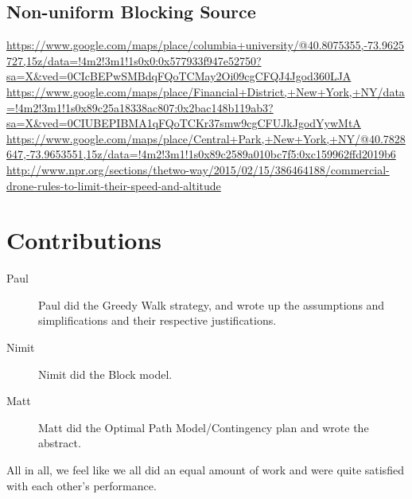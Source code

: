 \documentclass{article}
\begin{document}
\subsection{Non-uniform Blocking Source}
\label{sub:fk}






\begin{thebibliography}{9}
    \url{https://www.google.com/maps/place/columbia+university/@40.8075355,-73.9625727,15z/data=!4m2!3m1!1s0x0:0x577933f947e52750?sa=X&ved=0CIcBEPwSMBdqFQoTCMay2Oi09cgCFQJ4Jgod360LJA}
    \url{https://www.google.com/maps/place/Financial+District,+New+York,+NY/data=!4m2!3m1!1s0x89c25a18338ac807:0x2bac148b119ab3?sa=X&ved=0CIUBEPIBMA1qFQoTCKr37smw9cgCFUJkJgodYywMtA}
    \url{https://www.google.com/maps/place/Central+Park,+New+York,+NY/@40.7828647,-73.9653551,15z/data=!4m2!3m1!1s0x89c2589a010bc7f5:0xc159962ffd2019b6}
    \url{http://www.npr.org/sections/thetwo-way/2015/02/15/386464188/commercial-drone-rules-to-limit-their-speed-and-altitude}
\end{thebibliography}

\section{Contributions}
\label{sec:contributions}
\begin{description}
  \item[Paul] Paul did the Greedy Walk strategy, and wrote up the assumptions and simplifications and their respective justifications.
  \item[Nimit] Nimit did the Block model.
  \item[Matt] Matt did the Optimal Path Model/Contingency plan and wrote the abstract.
\end{description}
All in all, we feel like we all did an equal amount of work and were quite satisfied with each other's performance.
\end{document}
